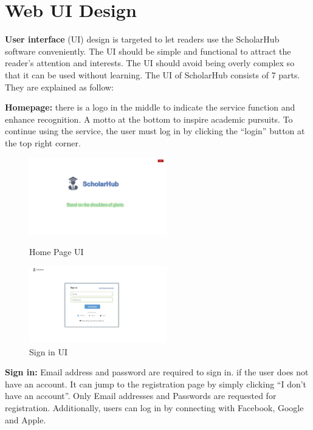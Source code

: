 \section{Web UI Design}

\textbf {User interface} (UI) design is targeted to let readers use the ScholarHub software conveniently. The UI should be simple and functional to attract the reader’s attention and interests. The UI should avoid being overly complex so that it can be used without learning. The UI of ScholarHub consists of 7 parts. They are explained as follow:

\textbf {Homepage:} there is a logo in the middle to indicate the service function and enhance recognition. A motto at the bottom to inspire academic pursuits. To continue using the service, the user must log in by clicking the “login” button at the top right corner.


\begin{figure}[htbp]
	\centering
	\begin{minipage}[t]{0.48\textwidth}
		\centering
		\includegraphics[width=6cm]{./img/UI Home page.jpg}
		\caption{Home Page UI}
	\end{minipage}
	\begin{minipage}[t]{0.48\textwidth}
		\centering
		\includegraphics[width=6cm]{./img/UI sign in.jpg}
		\caption{Sign in UI}
	\end{minipage}
\end{figure}

\textbf {Sign in:} Email address and password are required to sign in. if the user does not have an account. It can jump to the registration page by simply clicking “I don’t have an account”. Only Email addresses and Passwords are requested for registration. Additionally, users can log in by connecting with Facebook, Google and Apple.

